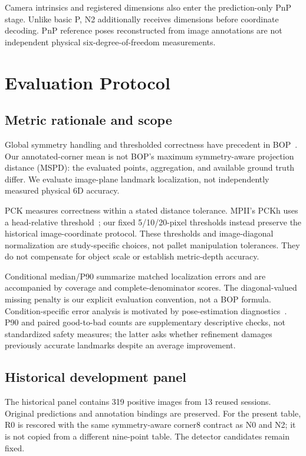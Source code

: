 \documentclass[journal]{IEEEtran}
\begin{document}
Camera intrinsics and registered dimensions also enter the prediction-only PnP stage. Unlike basic P, N2 additionally receives dimensions before coordinate decoding. PnP reference poses reconstructed from image annotations are not independent physical six-degree-of-freedom measurements.

\section{Evaluation Protocol}
\subsection{Metric rationale and scope}
Global symmetry handling and thresholded correctness have precedent in BOP~\cite{bop2020metrics}. Our annotated-corner mean is not BOP's maximum symmetry-aware projection distance (MSPD): the evaluated points, aggregation, and available ground truth differ. We evaluate image-plane landmark localization, not independently measured physical 6D accuracy.

PCK measures correctness within a stated distance tolerance. MPII's PCKh uses a head-relative threshold~\cite{mpii2014metrics}; our fixed 5/10/20-pixel thresholds instead preserve the historical image-coordinate protocol. These thresholds and image-diagonal normalization are study-specific choices, not pallet manipulation tolerances. They do not compensate for object scale or establish metric-depth accuracy.

Conditional median/P90 summarize matched localization errors and are accompanied by coverage and complete-denominator scores. The diagonal-valued missing penalty is our explicit evaluation convention, not a BOP formula. Condition-specific error analysis is motivated by pose-estimation diagnostics~\cite{ronchi2017metrics}. P90 and paired good-to-bad counts are supplementary descriptive checks, not standardized safety measures; the latter asks whether refinement damages previously accurate landmarks despite an average improvement.

\subsection{Historical development panel}
The historical panel contains 319 positive images from 13 reused sessions. Original predictions and annotation bindings are preserved. For the present table, R0 is rescored with the same symmetry-aware corner8 contract as N0 and N2; it is not copied from a different nine-point table. The detector candidates remain fixed.
\end{document}
